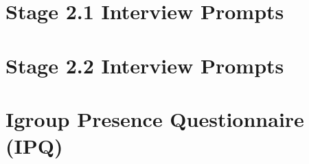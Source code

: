 \documentclass[a4paper]{report}
\begin{document}
\begin{appendices}
\chapter{Stage 2.1 Interview Prompts}

\label{appendix-interview-questions-stage-2-1}

\chapter{Stage 2.2 Interview Prompts}

\label{appendix-interview-questions-stage-2-2}

\chapter{Igroup Presence Questionnaire (IPQ)}

\label{appendix-igroup-presence-questionnaire}

\end{appendices}





\end{document}
